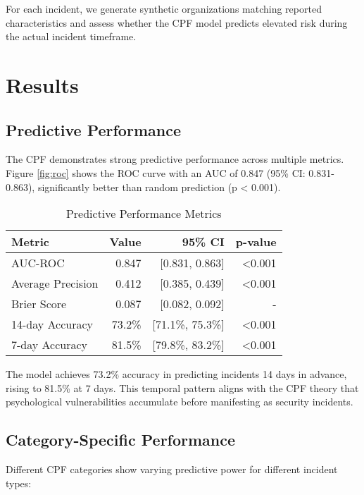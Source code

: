 \documentclass[10pt,twocolumn]{IEEEtran}
\begin{document}
For each incident, we generate synthetic organizations matching reported characteristics and assess whether the CPF model predicts elevated risk during the actual incident timeframe.

\section{Results}

\subsection{Predictive Performance}

The CPF demonstrates strong predictive performance across multiple metrics. Figure \ref{fig:roc} shows the ROC curve with an AUC of 0.847 (95\% CI: 0.831-0.863), significantly better than random prediction (p < 0.001).

\begin{table}[h]
\caption{Predictive Performance Metrics}
\label{tab:performance}
\centering
\begin{tabular}{@{}lrrr@{}}
\toprule
Metric & Value & 95\% CI & p-value \\
\midrule
AUC-ROC & 0.847 & [0.831, 0.863] & <0.001 \\
Average Precision & 0.412 & [0.385, 0.439] & <0.001 \\
Brier Score & 0.087 & [0.082, 0.092] & - \\
14-day Accuracy & 73.2\% & [71.1\%, 75.3\%] & <0.001 \\
7-day Accuracy & 81.5\% & [79.8\%, 83.2\%] & <0.001 \\
\bottomrule
\end{tabular}
\end{table}

The model achieves 73.2\% accuracy in predicting incidents 14 days in advance, rising to 81.5\% at 7 days. This temporal pattern aligns with the CPF theory that psychological vulnerabilities accumulate before manifesting as security incidents.

\subsection{Category-Specific Performance}

Different CPF categories show varying predictive power for different incident types:
\end{document}
